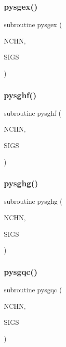 \subsubsection{\texorpdfstring{pysgex()}{pysgex()}}
{\footnotesize\ttfamily subroutine pysgex (\begin{DoxyParamCaption}\item[{}]{N\+C\+HN,  }\item[{}]{S\+I\+GS }\end{DoxyParamCaption})}

\mbox{\label{pythia-6_84_824_8f_a77c632d5235f03df7809688a7d6419bf}} 
\subsubsection{\texorpdfstring{pysghf()}{pysghf()}}
{\footnotesize\ttfamily subroutine pysghf (\begin{DoxyParamCaption}\item[{}]{N\+C\+HN,  }\item[{}]{S\+I\+GS }\end{DoxyParamCaption})}

\mbox{\label{pythia-6_84_824_8f_a57a12a8bdfcf423e5b0ed01349b0ff46}} 
\subsubsection{\texorpdfstring{pysghg()}{pysghg()}}
{\footnotesize\ttfamily subroutine pysghg (\begin{DoxyParamCaption}\item[{}]{N\+C\+HN,  }\item[{}]{S\+I\+GS }\end{DoxyParamCaption})}

\mbox{\label{pythia-6_84_824_8f_a370a25c3139b210db10c7b1a02289deb}} 
\subsubsection{\texorpdfstring{pysgqc()}{pysgqc()}}
{\footnotesize\ttfamily subroutine pysgqc (\begin{DoxyParamCaption}\item[{}]{N\+C\+HN,  }\item[{}]{S\+I\+GS }\end{DoxyParamCaption})}

